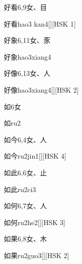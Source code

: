 \begin{entry}{好看}{6,9}{⼥、⽬}
  \begin{phonetics}{好看}{hao3 kan4}[][HSK 1]
  \end{phonetics}
\end{entry}

\begin{entry}{好象}{6,11}{⼥、⾗}
  \begin{phonetics}{好象}{hao3xiang4}
  \end{phonetics}
\end{entry}

\begin{entry}{好像}{6,13}{⼥、⼈}
  \begin{phonetics}{好像}{hao3xiang4}[][HSK 2]
  \end{phonetics}
\end{entry}

\begin{entry}{如}{6}{⼥}
  \begin{phonetics}{如}{ru2}
  \end{phonetics}
\end{entry}

\begin{entry}{如今}{6,4}{⼥、⼈}
  \begin{phonetics}{如今}{ru2jin1}[][HSK 4]
  \end{phonetics}
\end{entry}

\begin{entry}{如此}{6,6}{⼥、⽌}
  \begin{phonetics}{如此}{ru2ci3}
  \end{phonetics}
\end{entry}

\begin{entry}{如何}{6,7}{⼥、⼈}
  \begin{phonetics}{如何}{ru2he2}[][HSK 3]
  \end{phonetics}
\end{entry}

\begin{entry}{如果}{6,8}{⼥、⽊}
  \begin{phonetics}{如果}{ru2guo3}[][HSK 2]
  \end{phonetics}
\end{entry}

